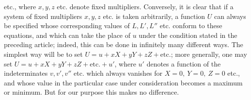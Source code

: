 etc., where \(x,y,z\) etc. denote fixed multipliers. Conversely, it is clear that if a system of fixed multipliers \(x,y,z\) etc. is taken arbitrarily, a function \(U\) can always be specified whose corresponding values of \(L,L',L''\) etc. conform to these equations, and which can take the place of \(u\) under the condition stated in the preceding article; indeed, this can be done in infinitely many different ways. The simplest way will be to set \(U=u+xX+yY+zZ+\text{etc.}\); more generally, one may set \(U=u+xX+yY+zZ+\text{etc.}+u'\), where \(u'\) denotes a function of the indeterminates \(v,v',v''\) etc. which always vanishes for \(X=0,\ Y=0,\ Z=0\) etc., and whose value in the particular case under consideration becomes a maximum or minimum. But for our purpose this makes no difference.

\clearpage
